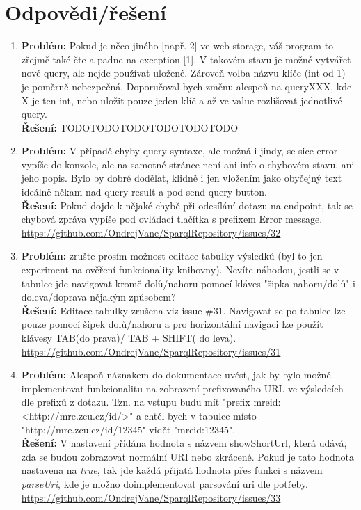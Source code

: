 \documentclass[
12pt,
a4paper,
pdftex,
czech,
titlepage
]{report}
\begin{document}
\section{Odpovědi/řešení} 
	\begin{enumerate}
		\item  \textbf{Problém:} Pokud je něco jiného [např. 2] ve web storage, váš program to zřejmě také čte a padne na exception [1]. V takovém stavu je možné vytvářet nové query, ale nejde používat uložené.
		Zároveň volba názvu klíče (int od 1) je poměrně nebezpečná. Doporučoval bych změnu alespoň na queryXXX, kde X je ten int, nebo uložit pouze jeden klíč a až ve value rozlišovat jednotlivé query.
		\\
		\textbf{Řešení:} TODOTODOTODOTODOTODOTODO
		\item  \textbf{Problém:} V případě chyby query syntaxe, ale možná i jindy, se sice error vypíše do konzole, ale na samotné stránce není ani info o chybovém stavu, ani jeho popis. Bylo by dobré dodělat, klidně i jen vložením jako obyčejný text ideálně někam nad query result a pod send query button.
		\\
		\textbf{Řešení:} Pokud dojde k nějaké chybě při odesílání dotazu na endpoint, tak se chybová zpráva vypíše pod ovládací tlačítka s prefixem Error message.\\ \url{https://github.com/OndrejVane/SparqlRepository/issues/32}
		\item  \textbf{Problém:} zrušte prosím možnost editace tabulky výsledků (byl to jen experiment na ověření funkcionality knihovny). Nevíte náhodou, jestli se v tabulce jde navigovat kromě dolů/nahoru pomocí kláves "šipka nahoru/dolů" i doleva/doprava nějakým způsobem?
		\\
		\textbf{Řešení:} Editace tabulky zrušena viz issue \#31. Navigovat se po tabulce lze pouze pomocí šipek dolů/nahoru a pro horizontální navigaci lze použít klávesy TAB(do prava)/ TAB + SHIFT( do leva).
		\\
		\url{https://github.com/OndrejVane/SparqlRepository/issues/31}
		\item  \textbf{Problém:} Alespoň náznakem do dokumentace uvést, jak by bylo možné implementovat funkcionalitu na zobrazení prefixovaného URL ve výsledcích dle prefixů z dotazu. Tzn. na vstupu budu mít "prefix mreid: <http://mre.zcu.cz/id/>" a chtěl bych v tabulce místo\\ "http://mre.zcu.cz/id/12345" vidět "mreid:12345".
		\\
		\textbf{Řešení:} V nastavení přidána hodnota s názvem showShortUrl, která udává, zda se budou zobrazovat normální URI nebo zkrácené. Pokud je tato hodnota nastavena na \textit{true}, tak jde každá přijatá hodnota přes funkci s názvem \textit{parseUri}, kde je možno doimplementovat parsování uri dle potřeby.
		\\
		\url{https://github.com/OndrejVane/SparqlRepository/issues/33}
	\end{enumerate}
\end{document}
